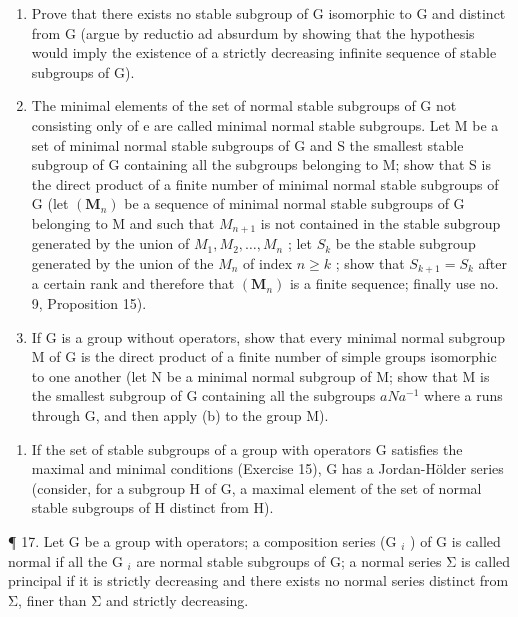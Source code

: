 \begin{enumerate}
\def\labelenumi{(\alph{enumi})}
\item
  Prove that there exists no stable subgroup of G isomorphic to G and distinct from G (argue by reductio ad absurdum by showing that the hypothesis would imply the existence of a strictly decreasing infinite sequence of stable subgroups of G).
\item
  The minimal elements of the set of normal stable subgroups of G not consisting only of e are called minimal normal stable subgroups. Let M be a set of minimal normal stable subgroups of G and S the smallest stable subgroup of G containing all the subgroups belonging to M; show that S is the direct product of a finite number of minimal normal stable subgroups of G (let \((\mathbf{M}_{n})\) be a sequence of minimal normal stable subgroups of G belonging to M and such that \(M_{n+1}\) is not contained in the stable subgroup generated by the union of \(M_{1}, M_{2}, \ldots, M_{n}\) ; let \(S_{k}\) be the stable subgroup generated by the union of the \(M_{n}\) of index \(n \geqslant k\) ; show that \(S_{k+1} = S_{k}\) after a certain rank and therefore that \((\mathbf{M}_{n})\) is a finite sequence; finally use no. 9, Proposition 15).
\item
  If G is a group without operators, show that every minimal normal subgroup M of G is the direct product of a finite number of simple groups isomorphic to one another (let N be a minimal normal subgroup of M; show that M is the smallest subgroup of G containing all the subgroups \(aNa^{-1}\) where a runs through G, and then apply (b) to the group M).
\end{enumerate}

\begin{enumerate}
\def\labelenumi{\arabic{enumi}.}
\setcounter{enumi}{15}
\tightlist
\item
  If the set of stable subgroups of a group with operators G satisfies the maximal and minimal conditions (Exercise 15), G has a Jordan-Hölder series (consider, for a subgroup H of G, a maximal element of the set of normal stable subgroups of H distinct from H).
\end{enumerate}

¶ 17. Let G be a group with operators; a composition series (G \(_{i}\) ) of G is called normal if all the G \(_{i}\) are normal stable subgroups of G; a normal series Σ is called principal if it is strictly decreasing and there exists no normal series distinct from Σ, finer than Σ and strictly decreasing.

